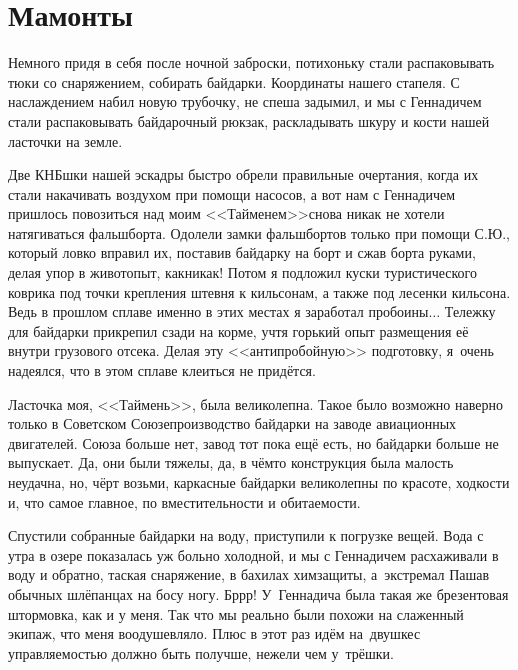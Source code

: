 \chapter{Мамонты} 
\vepsianrose

Немного придя в себя после ночной заброски, потихоньку стали распаковывать тюки со снаряжением, собирать байдарки. Координаты нашего стапеля\mdash \CoordsGorunSixteenStapel. С наслаждением  набил новую трубочку, не спеша задымил, и мы с Геннадичем стали распаковывать байдарочный рюкзак, раскладывать шкуру и кости нашей ласточки на земле. 

Две КНБ\sdash шки нашей эскадры быстро обрели правильные очертания, когда их стали накачивать воздухом при помощи насосов, а вот нам с Геннадичем пришлось повозиться над моим <<Тайменем>>\mdash снова никак не хотели натягиваться фальшборта. Одолели замки фальшбортов только при помощи С.Ю., который ловко вправил их, поставив байдарку на борт и сжав борта руками, делая упор в живот\mdash опыт, как\sdash никак! 
\newpage
Потом я подложил куски туристического коврика под точки крепления штевня к кильсонам, а также под лесенки кильсона. Ведь в прошлом сплаве именно в этих местах я заработал пробоины$\ldots$ Тележку для байдарки прикрепил сзади на корме, учтя горький опыт размещения её внутри грузового отсека. Делая эту <<антипробойную>> подготовку, я~очень надеялся, что в этом сплаве клеиться не придётся. 

Ласточка моя, <<Таймень>>, была великолепна. Такое было возможно наверно только в Советском Союзе\mdash производство байдарки на заводе авиационных двигателей. Союза больше нет, завод тот пока ещё есть, но байдарки больше не выпускает. Да, они были тяжелы, да, в чём\sdash то конструкция была малость неудачна, но, чёрт возьми, каркасные байдарки великолепны по красоте, ходкости и, что самое главное, по вместительности и обитаемости.

Спустили собранные байдарки на воду, приступили к погрузке вещей. Вода с утра в озере показалась уж больно холодной, и мы с Геннадичем расхаживали в воду и обратно, таская снаряжение, в бахилах химзащиты, а~экстремал Паша\mdash в обычных шлёпанцах на босу ногу. Бр\sdash р\sdash р! У~Геннадича была такая же брезентовая штормовка, как и у меня. Так что мы реально были похожи на слаженный экипаж, что меня воодушевляло. Плюс в этот раз идём на~двушке\mdash с управляемостью должно быть получше, нежели чем у~трёшки.

